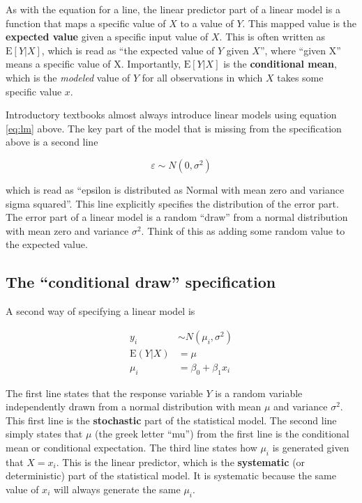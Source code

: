 \documentclass[]{book}
\begin{document}
As with the equation for a line, the linear predictor part of a linear
model is a function that maps a specific value of \(X\) to a value of
\(Y\). This mapped value is the \textbf{expected value} given a specific
input value of \(X\). This is often written as \(\mathrm{E}[Y|X]\),
which is read as ``the expected value of \(Y\) given \(X\)'', where
``given X'' means a specific value of X. Importantly,
\(\mathrm{E}[Y|X]\) is the \textbf{conditional mean}, which is the
\emph{modeled} value of \(Y\) for all observations in which \(X\) takes
some specific value \(x\).

Introductory textbooks almost always introduce linear models using
equation \eqref{eq:lm} above. The key part of the model that is missing
from the specification above is a second line

\begin{equation}
\varepsilon \sim N(0, \sigma^2)
\end{equation}

which is read as ``epsilon is distributed as Normal with mean zero and
variance sigma squared''. This line explicitly specifies the
distribution of the error part. The error part of a linear model is a
random ``draw'' from a normal distribution with mean zero and variance
\(\sigma^2\). Think of this as adding some random value to the expected
value.

\subsection{\texorpdfstring{The ``conditional draw''
specification}{The conditional draw specification}}\label{the-conditional-draw-specification}

A second way of specifying a linear model is

\begin{align}
y_i &\sim N(\mu_i, \sigma^2)\\
\mathrm{E}(Y|X) &= \mu\\
\mu_i &= \beta_0 + \beta_1 x_i
\label{eq:lm-spec2}
\end{align}

The first line states that the response variable \(Y\) is a random
variable independently drawn from a normal distribution with mean
\(\mu\) and variance \(\sigma^2\). This first line is the
\textbf{stochastic} part of the statistical model. The second line
simply states that \(\mu\) (the greek letter ``mu'') from the first line
is the conditional mean or conditional expectation. The third line
states how \(\mu_i\) is generated given that \(X=x_i\). This is the
linear predictor, which is the \textbf{systematic} (or deterministic)
part of the statistical model. It is systematic because the same value
of \(x_i\) will always generate the same \(\mu_i\).
\end{document}
